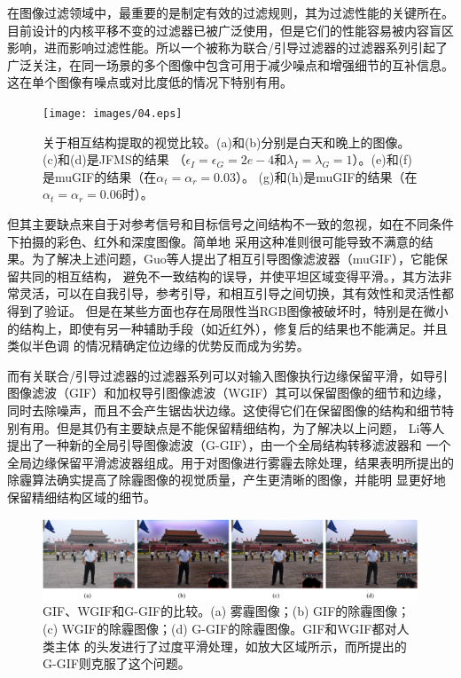 在图像过滤领域中，最重要的是制定有效的过滤规则，其为过滤性能的关键所在。目前设计的内核平移不变的过滤器已被广泛使用，但是它们的性能容易被内容盲区
影响，进而影响过滤性能。所以一个被称为联合/引导过滤器的过滤器系列引起了广泛关注，在同一场景的多个图像中包含可用于减少噪点和增强细节的互补信息。
这在单个图像有噪点或对比度低的情况下特别有用。

\begin{figure}[htbp]
	\begin{center}
	    \vspace{10pt} %
		\texttt{[image: images/04.eps]}
		\caption{关于相互结构提取的视觉比较。(a)和(b)分别是白天和晚上的图像。(c)和(d)是JFMS的结果
        （$\epsilon_{I}=\epsilon_{G}=2e-4$和$\lambda_{I}=\lambda_{G}=1$）。(e)和(f)是muGIF的结果（在$\alpha_{t}=\alpha_{r}=0.03$）。
        (g)和(h)是muGIF的结果（在$\alpha_{t}=\alpha_{r}=0.06$时）。} 
		\label{04} %
	\end{center}
\end{figure}

但其主要缺点来自于对参考信号和目标信号之间结构不一致的忽视，如在不同条件下拍摄的彩色、红外和深度图像。简单地
采用这种准则很可能导致不满意的结果。为了解决上述问题，Guo等人提出了相互引导图像滤波器（muGIF）\cite{MutuallyGuided2020}，它能保留共同的相互结构，
避免不一致结构的误导，并使平坦区域变得平滑。，其方法非常灵活，可以在自我引导，参考引导，和相互引导之间切换，其有效性和灵活性都得到了验证。
但是在某些方面也存在局限性当RGB图像被破坏时，特别是在微小的结构上，即使有另一种辅助手段（如近红外），修复后的结果也不能满足。并且类似半色调
的情况精确定位边缘的优势反而成为劣势。

而有关联合/引导过滤器的过滤器系列可以对输入图像执行边缘保留平滑，如导引图像滤波（GIF）和加权导引图像滤波（WGIF）其可以保留图像的细节和边缘，
同时去除噪声，而且不会产生锯齿状边缘。这使得它们在保留图像的结构和细节特别有用。但是其仍有主要缺点是不能保留精细结构，为了解决以上问题，
Li等人提出了一种新的全局引导图像滤波（G-GIF）\cite{SingleImageDeHazingUsingGloballyGuidedImageFiltering2018}，由一个全局结构转移滤波器和
一个全局边缘保留平滑滤波器组成。用于对图像进行雾霾去除处理，结果表明所提出的除霾算法确实提高了除霾图像的视觉质量，产生更清晰的图像，并能明
显更好地保留精细结构区域的细节。

\begin{figure}[htbp]
	\begin{center}
	    \vspace{10pt} %
		\includegraphics[width = 1\textwidth]{images/05.eps}
		\caption{GIF、WGIF和G-GIF的比较。(a) 雾霾图像；(b) GIF的除霾图像；(c) WGIF的除霾图像；(d) G-GIF的除霾图像。GIF和WGIF都对人类主体
        的头发进行了过度平滑处理，如放大区域所示，而所提出的G-GIF则克服了这个问题。} 
		\label{05} %
	\end{center}
\end{figure}

